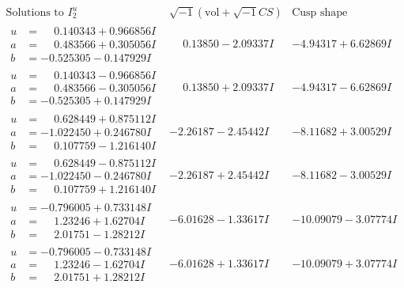 \documentclass[1p]{elsarticle_modified}
\theoremstyle{definition}
\newcommand{\I}{\sqrt{-1}}
\begin{document}
$$\begin{array}{c|c|c}  
\text{Solutions to }I^u_{2}& \I (\text{vol} + \sqrt{-1}CS) & \text{Cusp shape}\\
 \hline 
\begin{aligned}
u &= \phantom{-}0.140343 + 0.966856 I \\
a &= \phantom{-}0.483566 + 0.305056 I \\
b &= -0.525305 - 0.147929 I\end{aligned}
 & \phantom{-}0.13850 - 2.09337 I & -4.94317 + 6.62869 I \\ \hline\begin{aligned}
u &= \phantom{-}0.140343 - 0.966856 I \\
a &= \phantom{-}0.483566 - 0.305056 I \\
b &= -0.525305 + 0.147929 I\end{aligned}
 & \phantom{-}0.13850 + 2.09337 I & -4.94317 - 6.62869 I \\ \hline\begin{aligned}
u &= \phantom{-}0.628449 + 0.875112 I \\
a &= -1.022450 + 0.246780 I \\
b &= \phantom{-}0.107759 - 1.216140 I\end{aligned}
 & -2.26187 - 2.45442 I & -8.11682 + 3.00529 I \\ \hline\begin{aligned}
u &= \phantom{-}0.628449 - 0.875112 I \\
a &= -1.022450 - 0.246780 I \\
b &= \phantom{-}0.107759 + 1.216140 I\end{aligned}
 & -2.26187 + 2.45442 I & -8.11682 - 3.00529 I \\ \hline\begin{aligned}
u &= -0.796005 + 0.733148 I \\
a &= \phantom{-}1.23246 + 1.62704 I \\
b &= \phantom{-}2.01751 - 1.28212 I\end{aligned}
 & -6.01628 - 1.33617 I & -10.09079 - 3.07774 I \\ \hline\begin{aligned}
u &= -0.796005 - 0.733148 I \\
a &= \phantom{-}1.23246 - 1.62704 I \\
b &= \phantom{-}2.01751 + 1.28212 I\end{aligned}
 & -6.01628 + 1.33617 I & -10.09079 + 3.07774 I \\ \hline\begin{aligned}

\end{aligned}
\end{array}$$
\end{document}
